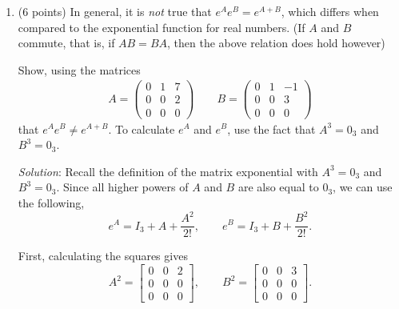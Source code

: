\documentclass{article}
\begin{document}
\begin{enumerate}
        Substituting for the right-hand side of this result, by the definition of the matrix exponential,
        \[
          \boxed{(e^A)^T=e^{A^T}}.
        \]

        Now suppose that $A$ is symmetric. By definition,
        $A^T=A$.

        Using the result above,
        \[
          (e^A)^T=e^{A^T}=e^A.
        \]

        Since $(e^A)^T=e^A$, the matrix $e^A$
        is symmetric.

        Therefore,
        \[
          \boxed{\text{If } A \text{ is symmetric, then }
            e^A \text{ is symmetric.}}
        \]

  \item (6 points) In general, it is \emph{not} true that $e^A e^B = e^{A+B}$, which differs when compared to the exponential function for real numbers. (If $A$ and $B$ commute, that is, if $AB = BA$, then the above relation does hold however)

        Show, using the matrices
        \begin{align*}
          A = \begin{pmatrix}
                0 & 1 & 7 \\
                0 & 0 & 2 \\
                0 & 0 & 0
              \end{pmatrix}
          \qquad
          B = \begin{pmatrix}
                0 & 1 & -1 \\
                0 & 0 & 3  \\
                0 & 0 & 0
              \end{pmatrix}
        \end{align*}
        that $e^A e^B \neq e^{A+B}$. To calculate $e^A$ and $e^B$, use the fact that $A^3 = 0_3$ and $B^3 = 0_3$.

        \emph{Solution}: Recall the definition of the matrix exponential with $A^3=0_3$ and $B^3=0_3$. Since all higher powers of $A$ and $B$ are also equal to $0_3$, we can use the following,
        \[
          e^A=I_3+A+\frac{A^2}{2!},
          \qquad
          e^B=I_3+B+\frac{B^2}{2!}.
        \]

        First, calculating the squares gives
        \[
          A^2=
          \begin{bmatrix}
            0 & 0 & 2 \\
            0 & 0 & 0 \\
            0 & 0 & 0
          \end{bmatrix},
          \qquad
          B^2=
          \begin{bmatrix}
            0 & 0 & 3 \\
            0 & 0 & 0 \\
            0 & 0 & 0
          \end{bmatrix}.
        \]


\end{enumerate}
\end{document}
